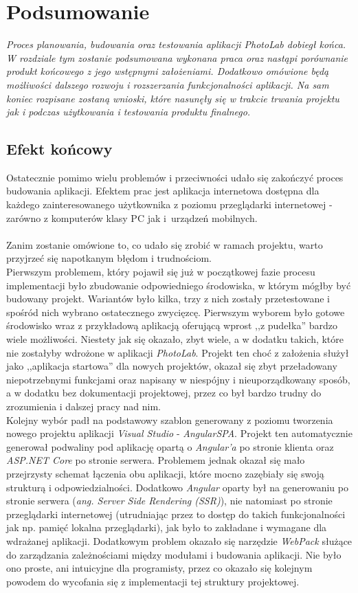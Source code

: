 \chapter{Podsumowanie}
    {\em \quad Proces planowania, budowania oraz testowania aplikacji PhotoLab dobiegł końca. W rozdziale tym zostanie podsumowana wykonana praca oraz nastąpi porównanie produkt końcowego z jego wstępnymi założeniami. Dodatkowo omówione będą możliwości dalszego rozwoju i rozszerzania funkcjonalności aplikacji. Na sam koniec rozpisane zostaną wnioski, które nasunęły się w trakcie trwania projektu jak i podczas użytkowania i testowania produktu finalnego.}
    
\section{Efekt końcowy}
\quad Ostatecznie pomimo wielu problemów i przeciwności udało się zakończyć proces budowania aplikacji. Efektem prac jest aplikacja internetowa dostępna dla każdego zainteresowanego użytkownika z poziomu przeglądarki internetowej - zarówno z komputerów klasy PC jak i~urządzeń mobilnych. \\
\\
Zanim zostanie omówione to, co udało się zrobić w ramach projektu, warto przyjrzeć się napotkanym błędom i trudnościom.\\
Pierwszym problemem, który pojawił się już w początkowej fazie procesu implementacji było zbudowanie odpowiedniego środowiska, w którym mógłby być budowany projekt. Wariantów było kilka, trzy z nich zostały przetestowane i spośród nich wybrano ostatecznego zwycięzcę. Pierwszym wyborem było gotowe środowisko wraz z przykładową aplikacją oferującą wprost ,,z pudełka'' bardzo wiele możliwości. Niestety jak się okazało, zbyt wiele, a w dodatku takich, które nie zostałyby wdrożone w aplikacji \textit{PhotoLab}. Projekt ten choć z założenia służył jako ,,aplikacja startowa'' dla nowych projektów, okazał się zbyt przeładowany niepotrzebnymi funkcjami oraz napisany w niespójny i nieuporządkowany sposób, a w dodatku bez dokumentacji projektowej, przez co był bardzo trudny do zrozumienia i dalszej pracy nad nim. \\
Kolejny wybór padł na podstawowy szablon generowany z poziomu tworzenia nowego projektu aplikacji \textit{Visual Studio} - \textit{AngularSPA}. Projekt ten automatycznie generował podwaliny pod aplikację opartą o \textit{Angular'a} po stronie klienta oraz \textit{ASP.NET Core} po stronie serwera. Problemem jednak okazał się mało przejrzysty schemat łączenia obu aplikacji, które mocno zazębiały się swoją strukturą i odpowiedzialności. Dodatkowo \textit{Angular} oparty był na generowaniu po stronie serwera (\textit{ang. Server Side Rendering (SSR)}), nie natomiast po stronie przeglądarki internetowej (utrudniając przez to dostęp do takich funkcjonalności jak np. pamięć lokalna przeglądarki), jak było to zakładane i wymagane dla wdrażanej aplikacji. Dodatkowym problem okazało się narzędzie \textit{WebPack} służące do zarządzania zależnościami między modułami i budowania aplikacji. Nie było ono proste, ani intuicyjne dla programisty, przez co okazało się kolejnym powodem do wycofania się z implementacji tej struktury projektowej. \\
